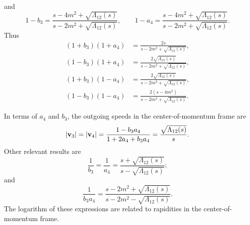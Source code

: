 and
\begin{equation}
	1 - b_{3} = \frac{s - 4m^{2} + \sqrt{\Lambda_{12}(s)}}{s - 2m^{2} + \sqrt{\Lambda_{12}(s)}}, \qquad
	1 - a_{4} = \frac{s - 4m^{2} + \sqrt{\Lambda_{12}(s)}}{s - 2m^{2} + \sqrt{\Lambda_{12}(s)}}.
\end{equation}
Thus
\begin{align}
	\left( 1 + b_{3} \right) \left( 1 + a_{4} \right) &= \frac{2s}{s - 2m^{2} + \sqrt{\Lambda_{12}(s)}}, \\
	\left( 1 - b_{3} \right) \left( 1 + a_{4} \right) &= \frac{ 2 \sqrt{\Lambda_{12}(s)} }{s - 2m^{2} + \sqrt{\Lambda_{12}(s)}}, \\
	\left( 1 + b_{3} \right) \left( 1 - a_{4} \right) &= \frac{ 2 \sqrt{\Lambda_{12}(s)} }{s - 2m^{2} + \sqrt{\Lambda_{12}(s)}}, \\
	\left( 1 - b_{3} \right) \left( 1 - a_{4} \right) &= \frac{ 2 \left( s - 4m^{2} \right)}{s - 2m^{2} + \sqrt{\Lambda_{12}(s)}}.
\end{align}

In terms of $a_{4}$ and $b_{3}$, the outgoing speeds in the center-of-momentum frame are
\begin{equation}
	\left\lvert \mathbf{v}_{3} \right\rvert = \left\lvert \mathbf{v}_{4} \right\rvert = \frac{1 - b_{3} a_{4}}{1 + 2 a_{4} + b_{3} a_{4}} = \frac{\sqrt{\Lambda_{12}(s)}}{s}.
\end{equation}
Other relevant results are
\begin{equation}
	\frac{1}{b_{3}} = \frac{1}{a_{4}} = \frac{s + \sqrt{\Lambda_{12}(s)}}{s - \sqrt{\Lambda_{12}(s)}};
\end{equation}
and
\begin{equation}
	\frac{1}{b_{3}a_{4}} = \frac{s - 2m^{2} + \sqrt{\Lambda_{12}(s)}}{s - 2m^{2} - \sqrt{\Lambda_{12}(s)}}.
\end{equation}
The logarithm of these expressions are related to rapidities in the center-of-momentum frame.

